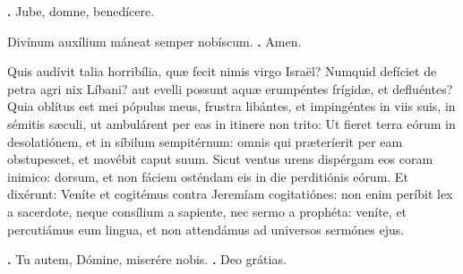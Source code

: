 \begin{small}
\textbf{\Vbar.} Jube, domne, benedícere.

Divínum auxílium máneat semper nobíscum. \textbf{\Rbar.} Amen.
\end{small}


Quis audívit talia horribília, quæ fecit nimis virgo Israël?
Numquid defíciet de petra agri nix Líbani? aut evelli possunt aquæ erumpéntes frígidæ, et defluéntes?
Quia oblítus est mei pópulus meus, frustra libántes, et impingéntes in viis suis, in sémitis sæculi, ut ambulárent per eas in itinere non trito:
Ut fieret terra eórum in desolatiónem, et in síbilum sempitérnum: omnis qui præteríerit per eam obstupescet, et movébit caput suum.
Sicut ventus urens dispérgam eos coram inimico: dorsum, et non fáciem osténdam eis in die perditiónis eórum.
Et dixérunt: Veníte et cogitémus contra Jeremíam cogitatiónes: non enim períbit lex a sacerdote, neque consílium a sapiente, nec sermo a prophéta: veníte, et percutiámus eum lingua, et non attendámus ad universos sermónes ejus.

\textbf{\Vbar.} Tu autem, Dómine, miserére nobis.
\textbf{\Rbar.} Deo grátias.

